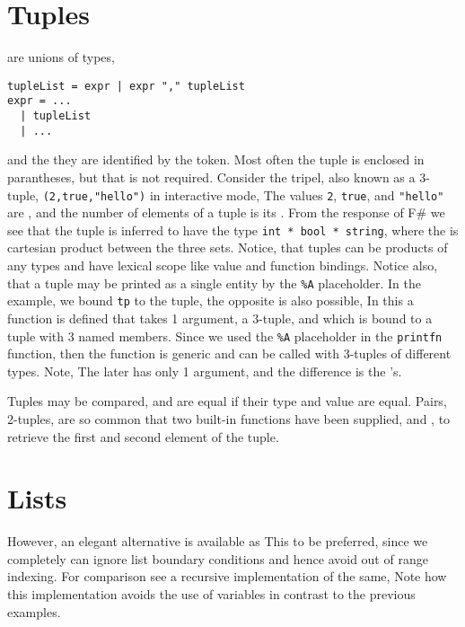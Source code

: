 \section{Tuples}
 are unions of types, 
%
\begin{lstlisting}[language=ebnf]
tupleList = expr | expr "," tupleList
expr = ... 
  | tupleList
  | ...
\end{lstlisting}
%
and the they are identified by the \token{,} token. Most often the tuple is enclosed in parantheses, but that is not required. Consider the tripel, also known as a 3-tuple, \lstinline!(2,true,"hello")! in interactive mode,
%
%
The values \lstinline!2!, \lstinline!true!, and \lstinline!"hello"! are , and the number of elements of a tuple is its . From the response of F\# we see that the tuple is inferred to have the type \lstinline!int * bool * string!, where the \token{*} is cartesian product between the three sets.  Notice, that tuples can be products of any types and have lexical scope like value and function bindings. Notice also, that a tuple may be printed as a single entity by the \lstinline!%A! placeholder. In the example, we bound \lstinline!tp! to the tuple, the opposite is also possible,
%
%
In this a function is defined that takes 1 argument, a 3-tuple, and which is bound to a tuple with 3 named members. Since we used the \lstinline!%A! placeholder in the \lstinline!printfn! function, then the function is generic and can be called with 3-tuples of different types. Note,   The later has only 1 argument, and the difference is the \token{,}'s.

Tuples may be compared, and are equal if their type and value are equal. Pairs, 2-tuples, are so common that two built-in functions have been supplied,  and , to retrieve the first and second element of the tuple. 

\section{Lists}



However, an elegant alternative is available as
This to be preferred, since we completely can ignore list boundary conditions and hence avoid out of range indexing. For comparison see a recursive implementation of the same,
Note how this implementation avoids the use of variables in contrast to the previous examples.




